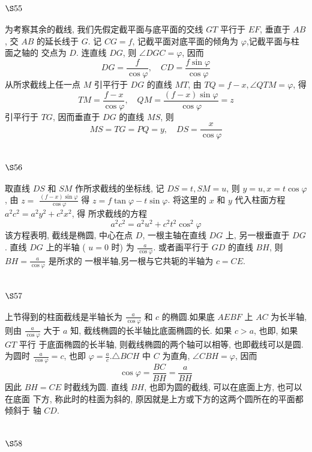\section{$\S 55$}

为考察其余的截线, 我们先假定截平面与底平面的交线 $G T$ 平行于 $E F$, 垂直于 $A B$, 交 $A B$ 的延长线于 $G$. 记 $C G=f$, 记截平面对底平面的倾角为 $\varphi$,记截平面与柱面之轴的 交点为 $D$. 连直线 $D G$, 则 $\angle D G C=\varphi$, 因而
\[
D G=\frac{f}{\cos \varphi}, \quad C D=\frac{f \sin \varphi}{\cos \varphi}
\]
从所求截线上任一点 $M$ 引平行于 $D G$ 的直线 $M T$, 由 $T Q=f-x, \angle Q T M=\varphi$, 得
\[
T M=\frac{f-x}{\cos \varphi}, \quad Q M=\frac{(f-x) \sin \varphi}{\cos \varphi}=z
\]
引平行于 $T G$, 因而垂直于 $D G$ 的直线 $M S$, 则
\[
M S=T G=P Q=y, \quad D S=\frac{x}{\cos \varphi}
\]
\section{$\S 56$}

取直线 $D S$ 和 $S M$ 作所求截线的坐标线, 记 $D S=t, S M=u$, 则 $y=u, x=t \cos \varphi$, 由 $z=$ $\frac{(f-x) \sin \varphi}{\cos \varphi}$ 得 $z=f \tan \varphi-t \sin \varphi$. 将这里的 $x$ 和 $y$ 代入柱面方程 $a^{2} c^{2}=a^{2} y^{2}+c^{2} x^{2}$, 得 所求截线的方程
\[
a^{2} c^{2}=a^{2} u^{2}+c^{2} t^{2} \cos ^{2} \varphi
\]
该方程表明, 截线是椭圆, 中心在点 $D$, 一根主轴在直线 $D G$ 上, 另一根垂直于 $D G$. 直线 $D G$ 上的半轴 ( $u=0$ 时) 为 $\frac{a}{\cos \varphi}$. 或者画平行于 $G D$ 的直线 $B H$, 则 $B H=\frac{a}{\cos \varphi}$ 是所求的 一根半轴,另一根与它共轭的半轴为 $c=C E$.

\section{$\S 57$}

上节得到的柱面截线是半轴长为 $\frac{a}{\cos \varphi}$ 和 $c$ 的椭圆.如果底 $A E B F$ 上 $A C$ 为长半轴, 则由 $\frac{a}{\cos \varphi}$ 大于 $a$ 知, 截线椭圆的长半轴比底面椭圆的长. 如果 $c>a$, 也即, 如果 $G T$ 平行 于底面椭圆的长半轴, 则截线椭圆的两个轴可以相等, 也即截线可以是圆. 为圆时 $\frac{a}{\cos \varphi}=c$, 也即 $\varphi=\frac{a}{c} . \triangle B C H$ 中 $C$ 为直角, $\angle C B H=\varphi$, 因而
\[
\cos \varphi=\frac{B C}{B H}=\frac{a}{B H}
\]
因此 $B H=C E$ 时截线为圆. 直线 $B H$, 也即为圆的截线, 可以在底面上方, 也可以在底面 下方, 称此时的柱面为斜的, 原因就是上方或下方的这两个圆所在的平面都倾斜于 轴 $C D$.

\section{$\S 58$}

